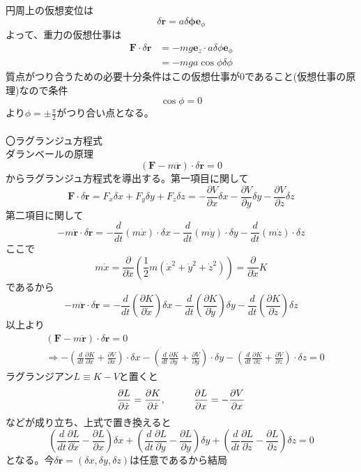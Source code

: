 \documentclass{jsarticle}
\begin{document}
円周上の仮想変位は
\[\delta\bm{r}=a\delta\bm{\phi}\bm{e}_{\phi}\]
よって、重力の仮想仕事は
\begin{align*}
\bm{F}\cdot\delta\bm{r}&=-mg\bm{e}_{z}\cdot a\delta\phi\bm{e}_{\phi}\\
&=-mga\cos\phi\delta\phi
\end{align*}
質点がつり合うための必要十分条件はこの仮想仕事が0であること(仮想仕事の原理)なので条件
\[\cos\phi=0\]
より\(\phi=\pm\frac{\pi}{2}\)がつり合い点となる。\\
\\
〇ラグランジュ方程式\\
ダランベールの原理
\[(\bm{F}-m\ddot{\bm{r}})\cdot\delta\bm{r}=0\]
からラグランジュ方程式を導出する。第一項目に関して
\[
\bm{F}\cdot\delta\bm{r}=F_{x}\delta x+F_{y}\delta y+F_{z}\delta z=-\frac{\partial V}{\partial x}\delta x-\frac{\partial V}{\partial y}\delta y-\frac{\partial V}{\partial z}\delta z
\]
第二項目に関して
\[-m\ddot{\bm{r}}\cdot\delta\bm{r}=-\frac{d}{dt}(m\dot{x})\cdot\delta x-\frac{d}{dt}(m\dot{y})\cdot\delta y-\frac{d}{dt}(m\dot{z})\cdot\delta z\]
ここで
\[m\dot{x}=\frac{\partial}{\partial\dot{x}}\left(\frac{1}{2}m(\dot{x}^{2}+\dot{y}^{2}+\dot{z}^{2})\right)=\frac{\partial}{\partial\dot{x}}K\]
であるから
\[-m\ddot{\bm{r}}\cdot\delta\bm{r}=-\frac{d}{dt}\left(\frac{\partial K}{\partial\dot{x}}\right)\delta x-\frac{d}{dt}\left(\frac{\partial K}{\partial\dot{y}}\right)\delta y-\frac{d}{dt}\left(\frac{\partial K}{\partial\dot{z}}\right)\delta z\]
以上より
\begin{align*}
&(\bm{F}-m\ddot{\bm{r}})\cdot\delta\bm{r}=0\\
&\Rightarrow-\left(\frac{d}{dt}\frac{\partial K}{\partial\dot{x}}+\frac{\partial V}{\partial x}\right)\cdot\delta x-\left(\frac{d}{dt}\frac{\partial K}{\partial\dot{y}}+\frac{\partial V}{\partial y}\right)\cdot\delta y-\left(\frac{d}{dt}\frac{\partial K}{\partial\dot{z}}+\frac{\partial V}{\partial z}\right)\cdot\delta z=0
\end{align*}
ラグランジアン\(L\equiv K-V\)と置くと
\[\frac{\partial L}{\partial \dot{x}}=\frac{\partial K}{\partial\dot{x}},\hspace{10mm}\frac{\partial L}{\partial x}=-\frac{\partial V}{\partial x}\]
などが成り立ち、上式で置き換えると
\[\left(\frac{d}{dt}\frac{\partial L}{\partial\dot{x}}-\frac{\partial L}{\partial x}\right)\delta x+\left(\frac{d}{dt}\frac{\partial L}{\partial\dot{y}}-\frac{\partial L}{\partial y}\right)\delta y+\left(\frac{d}{dt}\frac{\partial L}{\partial\dot{z}}-\frac{\partial L}{\partial z}\right)\delta z=0\]
となる。今\(\delta\bm{r}=(\delta x,\delta y,\delta z)\)は任意であるから結局
\end{document}
